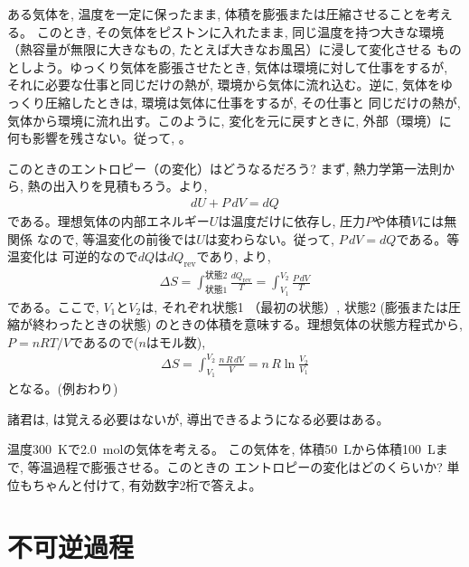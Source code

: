 \begin{exmpl}\label{exmpl:gas_expand_rev} 
ある気体を, 温度を一定に保ったまま, 体積を膨張または圧縮させることを考える。
このとき, その気体をピストンに入れたまま, 同じ温度を持つ大きな環境
（熱容量が無限に大きなもの, たとえば大きなお風呂）に浸して変化させる
ものとしよう。ゆっくり気体を膨張させたとき, 気体は環境に対して仕事をするが, 
それに必要な仕事と同じだけの熱が, 環境から気体に流れ込む。逆に, 
気体をゆっくり圧縮したときは, 環境は気体に仕事をするが, その仕事と
同じだけの熱が, 気体から環境に流れ出す。このように, 変化を元に戻すときに, 
外部（環境）に何も影響を残さない。従って, 。

このときのエントロピー（の変化）はどうなるだろう? 
まず, 熱力学第一法則から, 熱の出入りを見積もろう。より, 
\begin{eqnarray}
dU+P\,dV=dQ
\end{eqnarray}
である。理想気体の内部エネルギー$U$は温度だけに依存し, 圧力$P$や体積$V$には無関係
なので, 等温変化の前後では$U$は変わらない。従って, $P\,dV=dQ$である。等温変化は
可逆的なので$dQ$は$dQ_{\text{rev}}$であり, より, 
\begin{eqnarray}
\Delta S=\int_{\text{状態1}}^{\text{状態2}} \frac{dQ_{\text{rev}}}{T}=\int_{V_1}^{V_2}\frac{P\,dV}{T}
\end{eqnarray}
である。ここで, $V_1$と$V_2$は, それぞれ状態1 （最初の状態）, 状態2 (膨張または圧縮が終わったときの状態)
のときの体積を意味する。理想気体の状態方程式から, $P=nRT/V$であるので($n$はモル数), 
\begin{eqnarray}
\Delta S=\int_{V_1}^{V_2} \frac{n\,R\,dV}{V}=n\,R\ln\frac{V_2}{V_1}\label{eq:entropy_isothermal}
\end{eqnarray}
となる。(例おわり)\end{exmpl}

諸君は, は覚える必要はないが, 導出できるようになる必要はある。

\begin{q}\label{q:entropy_isothermal2} 温度300~Kで2.0~molの気体を考える。
この気体を, 体積50~Lから体積100~Lまで, 等温過程で膨張させる。このときの
エントロピーの変化はどのくらいか? 単位もちゃんと付けて, 有効数字2桁で答えよ。
\end{q}\mv


\section{不可逆過程}

